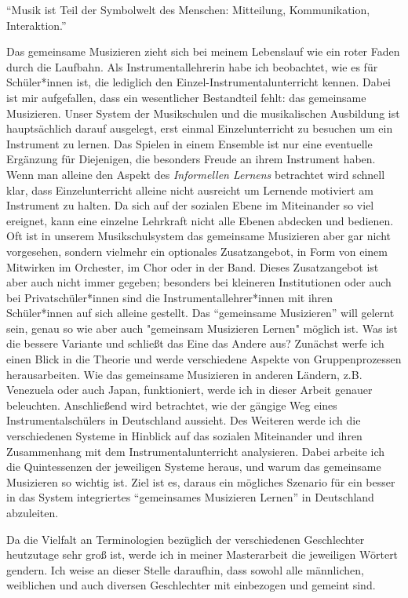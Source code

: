 
\enquote{Musik ist Teil der Symbolwelt des Menschen: Mitteilung, Kommunikation,
Interaktion.} \autocite[91]{doerne:umfassend_musizieren}

Das gemeinsame Musizieren zieht sich bei meinem Lebenslauf wie ein roter Faden
durch die Laufbahn. Als Instrumentallehrerin habe ich beobachtet, wie es für
Schüler*innen ist, die lediglich den Einzel-Instrumentalunterricht kennen. Dabei
ist mir aufgefallen, dass ein wesentlicher Bestandteil fehlt: das gemeinsame
Musizieren. Unser System der Musikschulen und die musikalischen Ausbildung ist
hauptsächlich darauf ausgelegt, erst einmal Einzelunterricht zu besuchen um ein
Instrument zu lernen. Das Spielen in einem Ensemble ist nur eine eventuelle
Ergänzung für Diejenigen, die besonders Freude an ihrem Instrument haben. Wenn
man alleine den Aspekt des
\emph{Informellen Lernens}
betrachtet wird schnell klar, dass Einzelunterricht alleine nicht ausreicht um
Lernende motiviert am Instrument zu halten. Da sich auf der sozialen Ebene im
Miteinander so viel ereignet, kann eine einzelne Lehrkraft nicht alle Ebenen
abdecken und bedienen. Oft ist in unserem Musikschulsystem das gemeinsame
Musizieren aber gar nicht vorgesehen, sondern vielmehr ein optionales
Zusatzangebot, in Form von einem Mitwirken im Orchester, im Chor oder in der
Band. Dieses Zusatzangebot ist aber auch nicht immer gegeben; besonders bei
kleineren Institutionen oder auch bei Privatschüler*innen sind die
Instrumentallehrer*innen mit ihren Schüler*innen auf sich alleine gestellt. Das
\enquote{gemeinsame Musizieren} will gelernt sein, genau so wie aber auch
"gemeinsam Musizieren Lernen" möglich ist. Was ist die bessere Variante und
schließt das Eine das Andere aus? Zunächst werfe ich einen Blick in die Theorie
und werde verschiedene Aspekte von Gruppenprozessen herausarbeiten. Wie das
gemeinsame Musizieren in anderen Ländern, z.B. Venezuela oder auch Japan,
funktioniert, werde ich in dieser Arbeit genauer beleuchten. Anschließend wird
betrachtet, wie der gängige Weg eines Instrumentalschülers in Deutschland
aussieht. Des Weiteren werde ich die verschiedenen Systeme in Hinblick auf das
sozialen Miteinander und ihren Zusammenhang mit dem Instrumentalunterricht
analysieren. Dabei arbeite ich die Quintessenzen der jeweiligen Systeme heraus,
und warum das gemeinsame Musizieren so wichtig ist. Ziel ist es, daraus ein
mögliches Szenario für ein besser in das System integriertes
\enquote{gemeinsames Musizieren Lernen} in Deutschland abzuleiten.


Da die Vielfalt an Terminologien bezüglich der verschiedenen Geschlechter
heutzutage sehr groß ist, werde ich in meiner Masterarbeit die jeweiligen
Wörtert gendern. Ich weise an dieser Stelle daraufhin, dass sowohl alle
männlichen, weiblichen und auch diversen Geschlechter mit einbezogen und gemeint
sind. 
